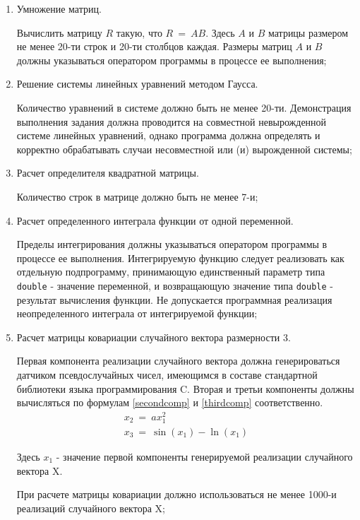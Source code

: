 
\begin{enumerate}

	\item Умножение матриц.
	
		Вычислить матрицу $R$ такую, что $R ~=~ AB$. Здесь $A$ и $B$ матрицы размером не менее 20-ти строк и 20-ти столбцов каждая. Размеры матриц $A$ и $B$ должны указываться оператором программы в процессе ее выполнения;

	\item Решение системы линейных уравнений методом Гаусса.

		Количество уравнений в системе должно быть не менее 20-ти. Демонстрация выполнения задания должна проводится на совместной невырожденной системе линейных уравнений, однако программа должна определять и корректно обрабатывать случаи несовместной или (и) вырожденной системы;

	\item Расчет определителя квадратной матрицы.

		Количество строк в матрице должно быть не менее 7-и;

	\item Расчет определенного интеграла функции от одной переменной.

		Пределы интегрирования должны указываться оператором программы в процессе ее выполнения. Интегрируемую функцию следует реализовать как отдельную подпрограмму, принимающую единственный параметр типа \verb|double| - значение переменной, и возвращающую значение типа \verb|double| - результат вычисления функции. Не допускается программная реализация неопределенного интеграла от интегрируемой функции;

	\item Расчет матрицы ковариации случайного вектора размерности 3.

		Первая компонента реализации случайного вектора должна генерироваться датчиком псевдослучайных чисел, имеющимся в составе стандартной библиотеки языка программирования C. Вторая и третьи компоненты должны вычисляться по формулам \eqref{secondcomp} и \eqref{thirdcomp} соответственно.
		\begin{gather}
			x_2 ~=~ a x_1^2 \label{secondcomp} \\
			x_3 ~=~ \sin(x_1) - \ln(x_1) \label{thirdcomp}
		\end{gather}

		Здесь $x_1$ - значение первой компоненты генерируемой реализации случайного вектора X.

		При расчете матрицы ковариации должно использоваться не менее 1000-и реализаций случайного вектора X;


\end{enumerate}
